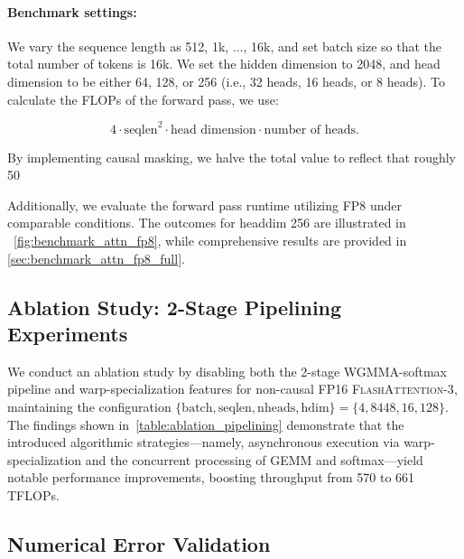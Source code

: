 \begin{algorithm}[H]
\begin{algorithmic}[1]
\begin{enumerate}
\paragraph{Benchmark settings:} We vary the sequence length as 512, 1k, ..., 16k, and set batch size so that the total number of tokens is 16k. We set the hidden dimension to 2048, and head dimension to be either 64, 128, or 256 (i.e., 32 heads, 16 heads, or 8 heads). To calculate the FLOPs of the forward pass, we use:

\begin{equation*}
  4 \cdot \text{seqlen}^2 \cdot \text{head dimension} \cdot \text{number of heads}.
\end{equation*}

By implementing causal masking, we halve the total value to reflect that roughly 50%

Additionally, we evaluate the forward pass runtime utilizing FP8 under comparable conditions. The outcomes for headdim 256 are illustrated in ~\cref{fig:benchmark_attn_fp8}, while comprehensive results are provided in \cref{sec:benchmark_attn_fp8_full}.

\subsection{Ablation Study: 2-Stage Pipelining Experiments}
\label{sec:2-stage-pipelining-experiments}

We conduct an ablation study by disabling both the 2-stage WGMMA-softmax pipeline and warp-specialization features for non-causal FP16 \textsc{FlashAttention-3}, maintaining the configuration $\{\text{batch}, \text{seqlen}, \text{nheads}, \text{hdim}\} = \{ 4, 8448, 16, 128\}$. The findings shown in~\cref{table:ablation_pipelining} demonstrate that the introduced algorithmic strategies—namely, asynchronous execution via warp-specialization and the concurrent processing of GEMM and softmax—yield notable performance improvements, boosting throughput from 570 to 661 TFLOPs.

\subsection{Numerical Error Validation}
\label{sec:numerical_error}


\end{enumerate}
\end{algorithmic}
\end{algorithm}
